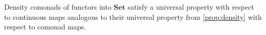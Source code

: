 \documentclass[11pt, oneside, article]{memoir}
\theoremstyle{plain}
\newtheorem{corollary}[theorem]{Corollary}
\theoremstyle{definition}
\theoremstyle{remark}
\newcommand{\namedcat}[1]{\mathbf{#1}}
\newcommand{\Set}{\namedcat{Set}}
\newcommand{\Cat}{\namedcat{Cat}}
\renewcommand{\Top}{\namedcat{Top}}
\newcommand{\Con}{\namedcat{Cmd}^\natural}
\newcommand{\ConSet}{\Con}
\newcommand{\ConO}{\Con}
\newcommand{\ConOSet}{\ConO}
\newcommand{\Ionad}{\namedcat{Ion}}
\newcommand{\xX}{X}
\begin{document}
  


  

  

Density comonads of functors into $\Set$ satisfy a universal property
with respect to continuous maps analogous to their universal property
from \cref{prop:density} with respect to comonad maps.
\end{document}
